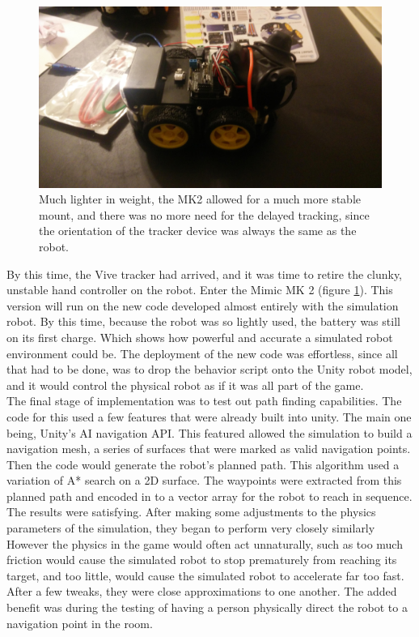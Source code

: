 \documentclass[10pt,a4paper]{article}
\begin{document}
	\begin{figure}
		\centering
		\includegraphics[width=.6\textwidth]{robotv2.jpg}
		\caption{Much lighter in weight, the MK2 allowed for a much more stable mount, and there was no more need for the delayed tracking, since the orientation of the tracker device was always the same as the robot.}
		\label{fig:mimic-mk2}
	\end{figure}
	
	By this time, the Vive tracker had arrived, and it was time to retire the clunky, unstable hand controller on the robot. Enter the Mimic MK 2 (figure \ref{fig:mimic-mk2}). This version will run on the new code developed almost entirely with the simulation robot. By this time, because the robot was so lightly used, the battery was still on its first charge. Which shows how powerful and accurate a simulated robot environment could be. The deployment of the new code was effortless, since all that had to be done, was to drop the behavior script onto the Unity robot model, and it would control the physical robot as if it was all part of the game.
	\\
	The final stage of implementation was to test out path finding capabilities. The code for this used a few features that were already built into unity. The main one being, Unity's AI navigation API. This featured allowed the simulation to build a navigation mesh, a series of surfaces that were marked as valid navigation points. Then the code would generate the robot's planned path. This algorithm used a variation of A* search on a 2D surface. The waypoints were extracted from this planned path and encoded in to a vector array for the robot to reach in sequence. The results were satisfying. After making some adjustments to the physics parameters of the simulation, they began to perform very closely similarly However the physics in the game would often act unnaturally, such as too much friction would cause the simulated robot to stop prematurely from reaching its target, and too little, would cause the simulated robot to accelerate far too fast. After a few tweaks, they were close approximations to one another. The added benefit was during the testing of having a person physically direct the robot to a navigation point in the room. 
	
\end{document}

